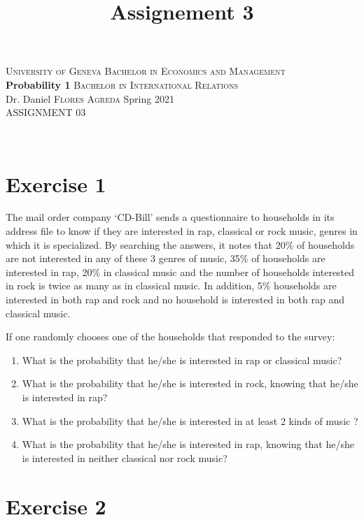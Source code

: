 \documentclass[12pt,thmsa]{article}\usepackage[]{graphicx}\usepackage[]{color}
\title{Assignement 3}
\begin{document}
\noindent \textsc{University of Geneva}     \hfill \textsc{Bachelor in Economics and Management} \\
\textbf{Probability 1}                      \hfill \textsc{Bachelor in International Relations} \\
Dr. Daniel \textsc{Flores Agreda}                 \hfill Spring 2021  \\
ASSIGNMENT 03



\noindent
\makebox[\linewidth]{\rule{\textwidth}{0.4pt}}\\[1.5ex]

\section*{Exercise 1}


The mail order company `CD-Bill' sends a questionnaire to households
in its address file to know if they are interested in rap,
classical or rock  music, genres in which it is specialized. By searching the answers, it
notes that 20\% of households are not interested in any of these 3 genres of music, 35\% of households are interested in rap, 20\% in classical music and the number of households interested in rock is twice as many as in classical music. In addition, 5\%
households are interested in both rap and rock and no household is interested
in both rap and classical music.

\medskip

\noindent If one randomly chooses one of the households that responded to the
  survey:

 \begin{enumerate}%
 \item What is the probability that he/she is interested in rap or
classical music?


 \item What is the probability that he/she is interested in rock, knowing
that he/she is interested in rap?


 \item What is the probability that he/she is interested in at least 2 kinds of
music ?

 \item What is the probability that he/she is interested in rap, knowing that he/she is interested in neither classical nor rock music?
 \end{enumerate}


\section*{Exercise 2}
\end{document}
